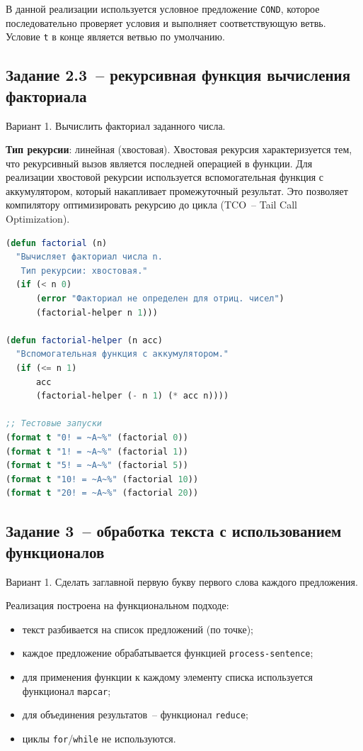 \documentclass[14pt,a4paper]{extarticle}
\begin{document}
В данной реализации используется условное предложение \texttt{COND}, которое последовательно проверяет условия и выполняет соответствующую ветвь. Условие \texttt{t} в конце является ветвью по умолчанию.

\newpage

\subsection{Задание 2.3~-- рекурсивная функция вычисления факториала}

Вариант 1. Вычислить факториал заданного числа.

\textbf{Тип рекурсии}: линейная (хвостовая). Хвостовая рекурсия характеризуется тем, что рекурсивный вызов является последней операцией в функции. Для реализации хвостовой рекурсии используется вспомогательная функция с аккумулятором, который накапливает промежуточный результат. Это позволяет компилятору оптимизировать рекурсию до цикла (TCO~-- Tail Call Optimization).

\begin{lstlisting}[caption={Задание 2.3~-- факториал (task2\_3.lisp)}, language=Lisp]
(defun factorial (n)
  "Вычисляет факториал числа n.
   Тип рекурсии: хвостовая."
  (if (< n 0)
      (error "Факториал не определен для отриц. чисел")
      (factorial-helper n 1)))

(defun factorial-helper (n acc)
  "Вспомогательная функция с аккумулятором."
  (if (<= n 1)
      acc
      (factorial-helper (- n 1) (* acc n))))

;; Тестовые запуски
(format t "0! = ~A~%" (factorial 0))
(format t "1! = ~A~%" (factorial 1))
(format t "5! = ~A~%" (factorial 5))
(format t "10! = ~A~%" (factorial 10))
(format t "20! = ~A~%" (factorial 20))
\end{lstlisting}

\newpage

\subsection{Задание 3~-- обработка текста с использованием функционалов}

Вариант 1. Сделать заглавной первую букву первого слова каждого предложения.

Реализация построена на функциональном подходе:
\begin{itemize}[nosep]
  \item текст разбивается на список предложений (по точке);
  \item каждое предложение обрабатывается функцией \texttt{process-sentence};
  \item для применения функции к каждому элементу списка используется функционал \texttt{mapcar};
  \item для объединения результатов~-- функционал \texttt{reduce};
  \item циклы \texttt{for}/\texttt{while} не используются.
\end{itemize}
\end{document}
